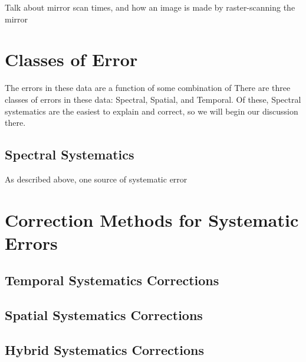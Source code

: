 \documentclass[12pt]{article}
\begin{document}
Talk about mirror scan times, and how an image is made by raster-scanning the
mirror

\section{Classes of Error}

The errors in these data are a function of some combination of 
There are three classes of errors in these data: Spectral, Spatial,
and Temporal. Of these, Spectral systematics are the easiest to explain and
correct, so we will begin our discussion there.

\subsection{Spectral Systematics}

As described above, one source of systematic error 

\section{Correction Methods for Systematic Errors}

\subsection{Temporal Systematics Corrections}

\subsection{Spatial Systematics Corrections}

\subsection{Hybrid Systematics Corrections}

\end{document}
